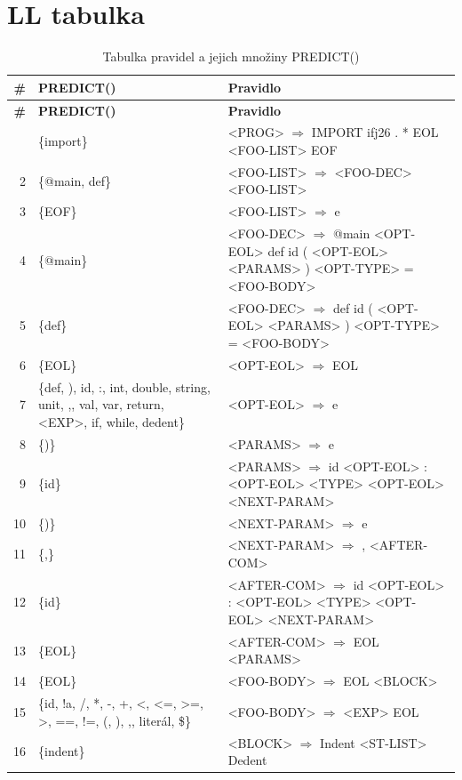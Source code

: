 \documentclass[12pt, a4paper]{article}
\begin{document}
\section{LL tabulka}
{
\scriptsize
\begin{longtable}{|r|>{\raggedright\arraybackslash}p{}|>{\raggedright\arraybackslash}p{}|}
\caption{Tabulka pravidel a jejich množiny PREDICT()}\\
\hline
\textbf{\#} & \textbf{PREDICT()} & \textbf{Pravidlo} \\
\hline
\endfirsthead
\hline
\textbf{\#} & \textbf{PREDICT()} & \textbf{Pravidlo} \\
\hline
\endhead
\hline
\endfoot
    1  & \{import\} & <PROG> $\Rightarrow$ IMPORT ifj26 . * EOL <FOO-LIST> EOF \\
    2  & \{@main, def\} & <FOO-LIST> $\Rightarrow$ <FOO-DEC> <FOO-LIST> \\
    3  & \{EOF\} & <FOO-LIST> $\Rightarrow$ e \\
    4  & \{@main\} & <FOO-DEC> $\Rightarrow$ @main <OPT-EOL> def id ( <OPT-EOL> <PARAMS> ) <OPT-TYPE> = <FOO-BODY> \\
    5  & \{def\} & <FOO-DEC> $\Rightarrow$ def id ( <OPT-EOL> <PARAMS> ) <OPT-TYPE> = <FOO-BODY> \\
    6  & \{EOL\} & <OPT-EOL> $\Rightarrow$ EOL \\
    7  & \{def, ), id, :, int, double, string, unit, ,, val, var, return, <EXP>, if, while, dedent\} & <OPT-EOL> $\Rightarrow$ e \\
    8  & \{)\} & <PARAMS> $\Rightarrow$ e \\
    9  & \{id\} & <PARAMS> $\Rightarrow$ id <OPT-EOL> : <OPT-EOL> <TYPE> <OPT-EOL> <NEXT-PARAM> \\
    10 & \{)\} & <NEXT-PARAM> $\Rightarrow$ e \\
    11 & \{,\} & <NEXT-PARAM> $\Rightarrow$ , <AFTER-COM> \\
    12 & \{id\} & <AFTER-COM> $\Rightarrow$ id <OPT-EOL> : <OPT-EOL> <TYPE> <OPT-EOL> <NEXT-PARAM> \\
    13 & \{EOL\} & <AFTER-COM> $\Rightarrow$ EOL <PARAMS> \\
    14 & \{EOL\} & <FOO-BODY> $\Rightarrow$ EOL <BLOCK> \\
    15 & \{id, !a, /, *, -, +, <, <=, >=, >, ==, !=, (, ), ,, literál, \$\} & <FOO-BODY> $\Rightarrow$ <EXP> EOL \\
    16 & \{indent\} & <BLOCK> $\Rightarrow$ Indent <ST-LIST> Dedent \\

\end{longtable}}
\end{document}
